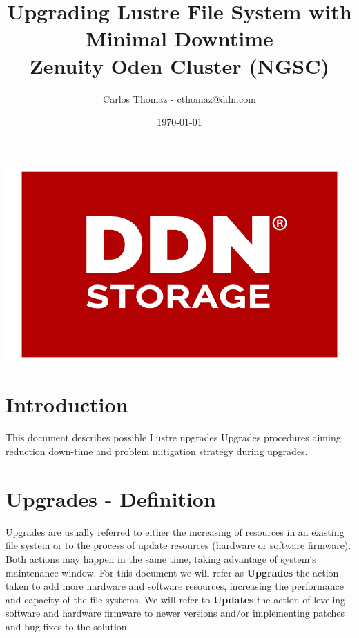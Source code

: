 \documentclass{article}
\title{%
Upgrading Lustre File System with Minimal Downtime\\
\large Zenuity Oden Cluster (NGSC)}
\author{Carlos Thomaz - cthomaz@ddn.com}
\date{\today}
\begin{document}
\maketitle


\begin{center}
    \includegraphics[scale=0.14]{logo.png}\\[1cm] 
\end{center}

\newpage

\begin{versionhistory}
\end{versionhistory}


\newpage
\section{Introduction}
This document describes possible Lustre upgrades Upgrades procedures aiming reduction down-time and problem  mitigation strategy during upgrades. 

\section{Upgrades - Definition}
Upgrades are usually referred to either the increasing of resources in an existing file system or to the process of update resources (hardware or software firmware). Both actions may happen in the same time, taking advantage of system's maintenance window. For this document we will refer as \textbf{Upgrades} the action taken to add more hardware and software resources, increasing the performance and capacity of the file systems. We will refer to \textbf{Updates} the action of leveling software and hardware firmware to newer versions and/or implementing patches and bug fixes to the solution.
\end{document}
